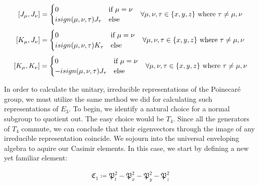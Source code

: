\documentclass[10pt]{ucthesis}
\begin{document}
\begin{equation}
\begin{aligned}
	[J_\mu,J_\nu] = \begin{cases}
							0 &\text{if } \mu=\nu \\
							isign(\mu,\nu,\tau)J_\tau & \text{else}
						\end{cases} \hspace{3mm} \forall \mu,\nu,\tau\in\{x,y,z\}\text{ where }\tau \neq\mu,\nu
\end{aligned}
\end{equation}
\begin{equation}
\begin{aligned}
	[K_\mu,J_\nu] = \begin{cases}
							0 &\text{if } \mu=\nu \\
							isign(\mu,\nu,\tau)K_\tau & \text{else}
						\end{cases} \hspace{3mm} \forall \mu,\nu,\tau\in\{x,y,z\}\text{ where }\tau \neq\mu,\nu
\end{aligned}
\end{equation}
\begin{equation}
\begin{aligned}
	[K_\mu,K_\nu] = \begin{cases}
							0 &\text{if } \mu=\nu \\
							-isign(\mu,\nu,\tau)J_\tau & \text{else}
						\end{cases} \hspace{3mm} \forall \mu,\nu,\tau\in\{x,y,z\}\text{ where }\tau \neq\mu,\nu
\end{aligned}
\end{equation}

In order to calculate the unitary, irreducible representations of the Poinecar\'e group, we must utilize the same method we did for calculating such representations of $E_3$. To begin, we identify a natural choice for a normal subgroup to quotient out. The easy choice would be $T_4$. Since all the generators of $T_4$ commute, we can conclude that their eigenvectors through the image of any irreducible representation coincide. We sojourn into the universal enveloping algebra to aquire our Casimir elements. In this case, we start by defining a new yet familiar element:

 
\begin{equation}
\begin{aligned}
	\mathfrak{C}_1 \coloneq \mathfrak{P}_t^2 -  \mathfrak{P}_x^2 -\mathfrak{P}_y^2- \mathfrak{P}_z^2
\end{aligned}
\end{equation}
\end{document}
